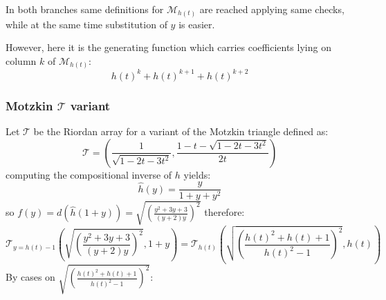 \documentclass[11pt,a4paper]{article} %
\begin{document}
    In both branches same definitions for $\mathcal{M}_{h(t)}$ are reached applying
    same checks, while at the same time substitution of $y$ is easier. 
    
    However, here it is the generating function which carries coefficients 
    lying on column $k$ of $\mathcal{M}_{h(t)}$:
    \begin{displaymath} 
        h(t)^{k}+h(t)^{k+1}+h(t)^{k+2}
    \end{displaymath} 


    \subsubsection{Motzkin $\mathcal{T}$ variant}

    Let $\mathcal{T}$ be the Riordan array for a variant of the Motzkin triangle defined as:
    \begin{displaymath} 
        \mathcal{T} = \left(\frac{1}{\sqrt{1-2t-3t^2}}, 
           \frac{1-t-\sqrt{1-2t-3t^2}}{2t}  \right)
    \end{displaymath} 
    computing the compositional inverse of $h$ yields:
    \begin{displaymath} 
        \hat{h}(y) = \frac{y}{1+y+y^2}
    \end{displaymath} 
    so $f(y)=d(\hat{h}(1+y))=\sqrt{\left(\frac{y^2+3y+3}{(y+2)y}\right)^{2}}$ therefore:
    \begin{displaymath} 
        \mathcal{T}_{y=h(t)-1}\left( \sqrt{\left(\frac{y^2+3y+3}{(y+2)y}\right)^{2}}, 1+y \right) = 
            \mathcal{T}_{h(t)}\left( \sqrt{\left(\frac{h(t)^2+h(t)+1}{h(t)^2-1}\right)^{2}}, h(t) \right) 
    \end{displaymath} 
    By cases on $\sqrt{\left(\frac{h(t)^2+h(t)+1}{h(t)^2-1}\right)^{2}}$:
\end{document}
